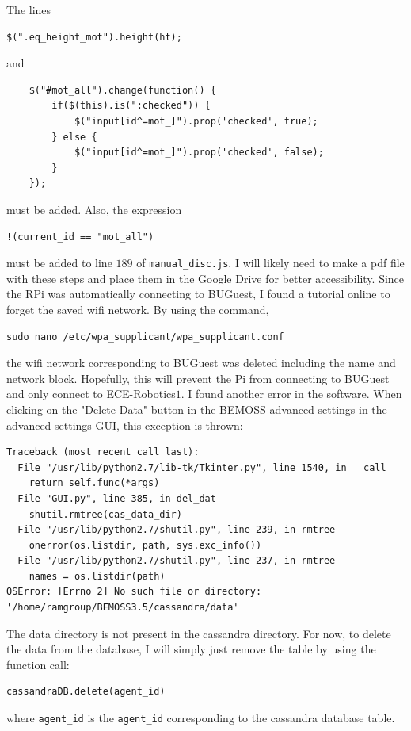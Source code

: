 \documentclass[fontsize=11pt, %
                             paper=letter, %
                             twoside, %
                             captions=tableheading,
                             index=totoc,
                             hyperref]{labbook}
\begin{document}
\begin{addmargin}[0cm]{0cm}
The lines 
\begin{verbatim}
$(".eq_height_mot").height(ht);
\end{verbatim}
and 
\begin{verbatim}
    $("#mot_all").change(function() {
        if($(this).is(":checked")) {
            $("input[id^=mot_]").prop('checked', true);
        } else {
            $("input[id^=mot_]").prop('checked', false);
        }
    });
\end{verbatim}
must be added. Also, the expression
\begin{verbatim}
!(current_id == "mot_all")
\end{verbatim} 
must be added to line $189$ of \texttt{manual\_disc.js}.
\bigbreak\noindent
I will likely need to make a pdf file with these steps and place them in the Google Drive for better accessibility. 
\bigbreak\noindent
Since the RPi was automatically connecting to BUGuest, I found a tutorial online to forget the saved wifi network. By using the command,
\begin{verbatim}
sudo nano /etc/wpa_supplicant/wpa_supplicant.conf
\end{verbatim}
the wifi network corresponding to BUGuest was deleted including the name and network block. Hopefully, this will prevent the Pi from connecting to BUGuest and only connect to ECE-Robotics$1$.
\bigbreak\noindent
I found another error in the software. When clicking on the "Delete Data" button in the BEMOSS advanced settings in the advanced settings GUI, this exception is thrown:
\medbreak
\begin{verbatim}
Traceback (most recent call last):
  File "/usr/lib/python2.7/lib-tk/Tkinter.py", line 1540, in __call__
    return self.func(*args)
  File "GUI.py", line 385, in del_dat
    shutil.rmtree(cas_data_dir)
  File "/usr/lib/python2.7/shutil.py", line 239, in rmtree
    onerror(os.listdir, path, sys.exc_info())
  File "/usr/lib/python2.7/shutil.py", line 237, in rmtree
    names = os.listdir(path)
OSError: [Errno 2] No such file or directory: 
'/home/ramgroup/BEMOSS3.5/cassandra/data'
\end{verbatim}
The data directory is not present in the cassandra directory. For now, to delete the data from the database, I will simply just remove the table by using the function call:
\medbreak
\begin{verbatim}
cassandraDB.delete(agent_id)
\end{verbatim}
where \texttt{agent\_id} is the \texttt{agent\_id} corresponding to the cassandra database table.

\end{addmargin}
\end{document}
